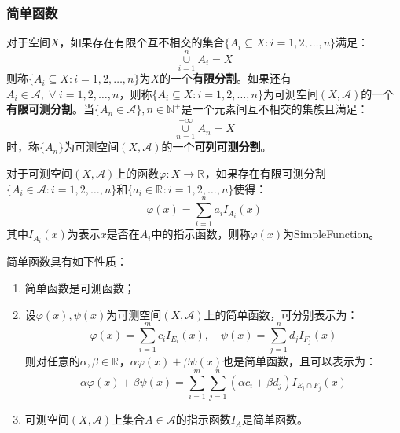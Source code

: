 \subsubsection{简单函数}
\begin{definition}
	对于空间$X$，如果存在有限个互不相交的集合$\{A_i\subseteq X:i=1,2,\dots,n\}$满足：
	\begin{equation*}
		\underset{i=1}{\overset{n}{\cup}}A_i=X
	\end{equation*}
	则称$\{A_i\subseteq X:i=1,2,\dots,n\}$为$X$的一个\textbf{有限分割}。如果还有$A_i\in \mathscr{A},\;\forall\;i=1,2,\dots,n$，则称$\{A_i\subseteq X:i=1,2,\dots,n\}$为可测空间$(X,\mathscr{A})$的一个\textbf{有限可测分割}。当$\{A_n\in\mathscr{A}\},n\in\mathbb{N}^+$是一个元素间互不相交的集族且满足：
	\begin{equation*}
		\underset{n=1}{\overset{+\infty}{\cup}}A_n=X
	\end{equation*}
	时，称$\{A_n\}$为可测空间$(X,\mathscr{A})$的一个\textbf{可列可测分割}。
\end{definition}
\begin{definition}
	对于可测空间$(X,\mathscr{A})$上的函数$\varphi:X\rightarrow \mathbb{R}^{}$，如果存在有限可测分割$\{A_i\in \mathscr{A}:i=1,2,\dots,n\}$和$\{a_i\in\mathbb{R}^{}:i=1,2,\dots,n\}$使得：
	\begin{equation*}
		\varphi(x)=\sum_{i=1}^{n}a_iI_{A_i}(x)
	\end{equation*}
	其中$I_{A_i}(x)$为表示$x$是否在$A_i$中的指示函数，则称$\varphi(x)$为\gls{SimpleFunction}。
\end{definition}
\begin{property}\label{prop:SimpleFunction}
	简单函数具有如下性质：
	\begin{enumerate}
		\item 简单函数是可测函数；
		\item 设$\varphi(x),\psi(x)$为可测空间$(X,\mathscr{A})$上的简单函数，可分别表示为：
		\begin{equation*}
			\varphi(x)=\sum_{i=1}^{m}c_iI_{E_i}(x),\quad
			\psi(x)=\sum_{j=1}^{n}d_jI_{F_j}(x)
		\end{equation*}
		则对任意的$\alpha,\beta\in\mathbb{R}^{}$，$\alpha\varphi(x)+\beta\psi(x)$也是简单函数，且可以表示为：
		\begin{equation*}
			\alpha\varphi(x)+\beta\psi(x)=\sum_{i=1}^{m}\sum_{j=1}^{n}(\alpha c_i+\beta d_j)I_{E_i\cap F_j}(x)
		\end{equation*}
		\item 可测空间$(X,\mathscr{A})$上集合$A\in\mathscr{A}$的指示函数$I_A$是简单函数。
	\end{enumerate}
\end{property}
